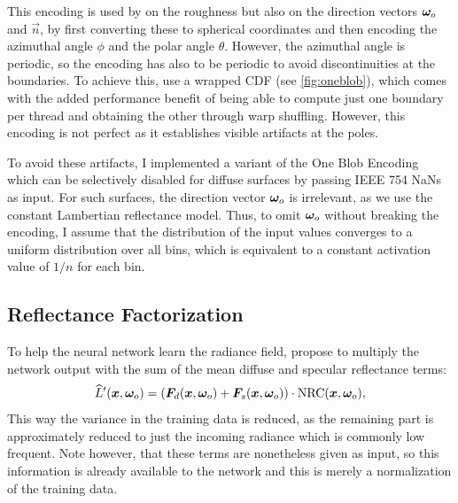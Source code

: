 This encoding is used by \textcite{muller2021} on the roughness but also on the direction vectors ${\bm{\omega}_o}$ and $\vec{n}$, by first converting these to spherical coordinates and then encoding the azimuthal angle $\phi$ and the polar angle $\theta$.
However, the azimuthal angle is periodic, so the encoding has also to be periodic to avoid discontinuities at the boundaries.
To achieve this, \textcite{muller2021} use a wrapped CDF (see \cref{fig:oneblob}), which comes with the added performance benefit of being able to compute just one boundary per thread and obtaining the other through warp shuffling.
However, this encoding is not perfect as it establishes visible artifacts at the poles.

To avoid these artifacts, I implemented a variant of the One Blob Encoding which can be selectively disabled for diffuse surfaces by passing IEEE 754 NaNs as input.
For such surfaces, the direction vector ${\bm{\omega}_o}$ is irrelevant, as we use the constant Lambertian reflectance model.
Thus, to omit ${\bm{\omega}_o}$ without breaking the encoding, I assume that the distribution of the input values converges to a uniform distribution over all bins, which is equivalent to a constant activation value of $1 / n$ for each bin.



\subsection{Reflectance Factorization}
To help the neural network learn the radiance field, \textcite{muller2021} propose to multiply the network output with the sum of the mean diffuse and specular reflectance terms:
\begin{equation}
    \widehat{L}'(\vec{x}, \wo) = \left( \vec{F}_d(\vec{x}, \wo) + \vec{F}_s(\vec{x}, \wo) \right) \cdot \mathrm{NRC}(\vec{x}, \wo),
\end{equation}
This way the variance in the training data is reduced, as the remaining part is approximately reduced to just the incoming radiance which is commonly low frequent.
Note however, that these terms are nonetheless given as input, so this information is already available to the network and this is merely a normalization of the training data.

